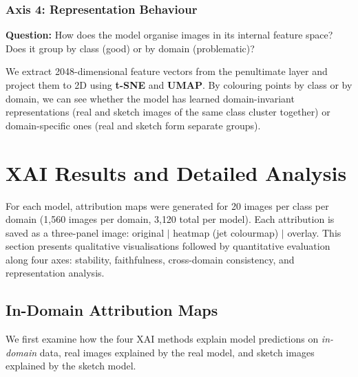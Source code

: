 \documentclass[12pt, a4paper]{article}
\begin{document}
\subsubsection{Axis 4: Representation Behaviour}

\textbf{Question:} How does the model organise images in its internal feature
space?  Does it group by class (good) or by domain (problematic)?

We extract 2048-dimensional feature vectors from the penultimate layer and
project them to 2D using \textbf{t-SNE} and \textbf{UMAP}.  By colouring
points by class or by domain, we can see whether the model has learned
domain-invariant representations (real and sketch images of the same class
cluster together) or domain-specific ones (real and sketch form separate
groups).


\section{XAI Results and Detailed Analysis}
\label{sec:xai_results}

For each model, attribution maps were generated for 20 images per class per
domain (1{,}560 images per domain, 3{,}120 total per model).  Each attribution
is saved as a three-panel image: original $|$ heatmap (jet colourmap) $|$
overlay.  This section presents qualitative visualisations followed by
quantitative evaluation along four axes: stability, faithfulness,
cross-domain consistency, and representation analysis.

\subsection{In-Domain Attribution Maps}
\label{sec:in_domain_attr}

We first examine how the four XAI methods explain model predictions on
\emph{in-domain} data, real images explained by the real model, and
sketch images explained by the sketch model.
\end{document}
